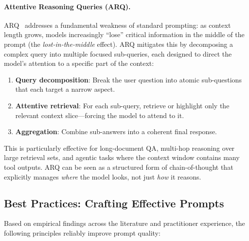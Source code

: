 \paragraph{Attentive Reasoning Queries (ARQ).}
\label{attentive-reasoning-queries-arq.}

ARQ~\cite{yang2025arq} addresses a fundamental weakness of standard prompting: as context length grows, models increasingly ``lose'' critical information in the middle of the prompt (the \emph{lost-in-the-middle} effect). ARQ mitigates this by decomposing a complex query into multiple focused sub-queries, each designed to direct the model’s attention to a specific part of the context:

\begin{enumerate}
  \item \textbf{Query decomposition}: Break the user question into atomic sub-questions that each target a narrow aspect.
  \item \textbf{Attentive retrieval}: For each sub-query, retrieve or highlight only the relevant context slice---forcing the model to attend to it.
  \item \textbf{Aggregation}: Combine sub-answers into a coherent final response.
\end{enumerate}

This is particularly effective for long-document QA, multi-hop reasoning over large retrieval sets, and agentic tasks where the context window contains many tool outputs. ARQ can be seen as a structured form of chain-of-thought that explicitly manages \emph{where} the model looks, not just \emph{how} it reasons.

\subsection{Best Practices: Crafting Effective Prompts}
\label{best-practices-crafting-effective-prompts}

Based on empirical findings across the literature and practitioner experience, the following principles reliably improve prompt quality:


